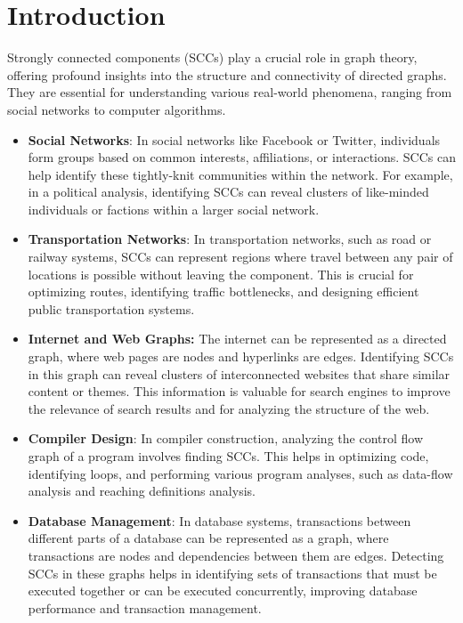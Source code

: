 \section{Introduction} \label{Sec: Introduction}

Strongly connected components (SCCs) play a crucial role in graph theory, offering profound insights into the structure and connectivity of directed graphs. They are essential for understanding various real-world phenomena, ranging from social networks to computer algorithms.
\begin{itemize} 

    \item \textbf{Social Networks}:  In social networks like Facebook or Twitter, individuals form groups based on common interests, affiliations, or interactions. SCCs can help identify these tightly-knit communities within the network. For example, in a political analysis, identifying SCCs can reveal clusters of like-minded individuals or factions within a larger social network.
    \item \textbf{Transportation Networks}:  In transportation networks, such as road or railway systems, SCCs can represent regions where travel between any pair of locations is possible without leaving the component. This is crucial for optimizing routes, identifying traffic bottlenecks, and designing efficient public transportation systems.
    \item \textbf{Internet and Web Graphs:} The internet can be represented as a directed graph, where web pages are nodes and hyperlinks are edges. Identifying SCCs in this graph can reveal clusters of interconnected websites that share similar content or themes. This information is valuable for search engines to improve the relevance of search results and for analyzing the structure of the web.
    \item \textbf{Compiler Design}:  In compiler construction, analyzing the control flow graph of a program involves finding SCCs. This helps in optimizing code, identifying loops, and performing various program analyses, such as data-flow analysis and reaching definitions analysis.
    \item \textbf{Database Management}: In database systems, transactions between different parts of a database can be represented as a graph, where transactions are nodes and dependencies between them are edges. Detecting SCCs in these graphs helps in identifying sets of transactions that must be executed together or can be executed concurrently, improving database performance and transaction management.
\end{itemize}

